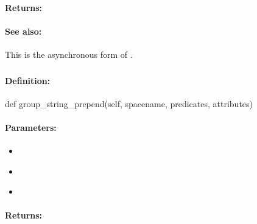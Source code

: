\paragraph{Returns:}


\paragraph{See also:}  This is the asynchronous form of .

\pagebreak
\subsubsection{}
\label{api:python:group_string_prepend}


\paragraph{Definition:}
\begin{pythoncode}
def group_string_prepend(self, spacename, predicates, attributes)
\end{pythoncode}

\paragraph{Parameters:}
\begin{itemize}[noitemsep]
\item {}\\

\item {}\\

\item {}\\

\end{itemize}

\paragraph{Returns:}


\pagebreak
